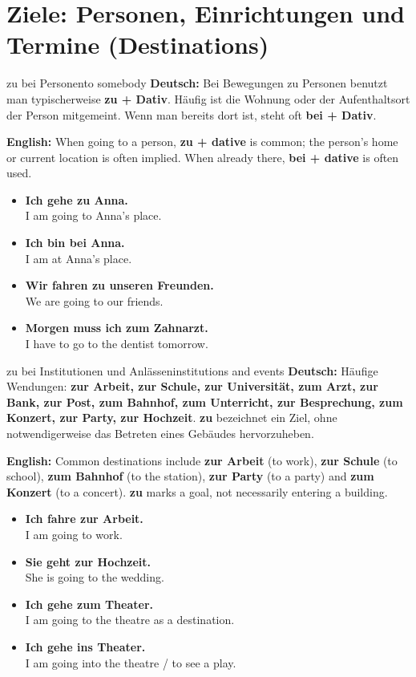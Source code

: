\documentclass[a4paper,11pt]{article}
\newcommand{\GermanText}[1]{\textbf{Deutsch: }#1\par}
\newcommand{\EnglishText}[1]{{\small\color{SoftGray}\textbf{English: }#1\par}}
\newcommand{\ExampleItem}[2]{\item \textbf{#1}\\{\small\color{SoftGray}#2}}
\begin{document}
\section{Ziele: Personen, Einrichtungen und Termine (Destinations)}
\begin{grammarentry}{zu bei Personen}{to somebody}
\GermanText{Bei Bewegungen zu Personen benutzt man typischerweise \textbf{zu + Dativ}. Häufig ist die Wohnung oder der Aufenthaltsort der Person mitgemeint. Wenn man bereits dort ist, steht oft \textbf{bei + Dativ}.}
\EnglishText{When going to a person, \textbf{zu + dative} is common; the person's home or current location is often implied. When already there, \textbf{bei + dative} is often used.}
\end{grammarentry}
\begin{exbox}\begin{itemize}
\ExampleItem{Ich gehe zu Anna.}{I am going to Anna's place.}
\ExampleItem{Ich bin bei Anna.}{I am at Anna's place.}
\ExampleItem{Wir fahren zu unseren Freunden.}{We are going to our friends.}
\ExampleItem{Morgen muss ich zum Zahnarzt.}{I have to go to the dentist tomorrow.}
\end{itemize}\end{exbox}
\begin{grammarentry}{zu bei Institutionen und Anlässen}{institutions and events}
\GermanText{Häufige Wendungen: \textbf{zur Arbeit, zur Schule, zur Universität, zum Arzt, zur Bank, zur Post, zum Bahnhof, zum Unterricht, zur Besprechung, zum Konzert, zur Party, zur Hochzeit}. \textbf{zu} bezeichnet ein Ziel, ohne notwendigerweise das Betreten eines Gebäudes hervorzuheben.}
\EnglishText{Common destinations include \textbf{zur Arbeit} (to work), \textbf{zur Schule} (to school), \textbf{zum Bahnhof} (to the station), \textbf{zur Party} (to a party) and \textbf{zum Konzert} (to a concert). \textbf{zu} marks a goal, not necessarily entering a building.}
\end{grammarentry}
\begin{exbox}\begin{itemize}
\ExampleItem{Ich fahre zur Arbeit.}{I am going to work.}
\ExampleItem{Sie geht zur Hochzeit.}{She is going to the wedding.}
\ExampleItem{Ich gehe zum Theater.}{I am going to the theatre as a destination.}
\ExampleItem{Ich gehe ins Theater.}{I am going into the theatre / to see a play.}
\end{itemize}\end{exbox}
\end{document}
